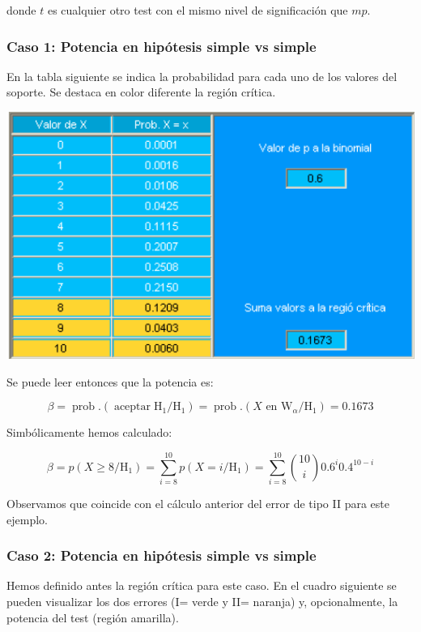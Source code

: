 \documentclass[
]{article}
\begin{document}
donde \(t\) es cualquier otro test con el mismo nivel de significación que \(mp\).

\subsubsection{Caso 1: Potencia en hipótesis simple vs simple}\label{caso-1-potencia-en-hipuxf3tesis-simple-vs-simple}

En la tabla siguiente se indica la probabilidad para cada uno de los valores del soporte. Se destaca en color diferente la región crítica.

\begin{center}\includegraphics[width=0.9\linewidth]{images/cap9-ProbsTestOptim} \end{center}

Se puede leer entonces que la potencia es:

\[
\beta=\operatorname{prob} .\left(\operatorname{aceptar} \mathrm{H}_{1} / \mathrm{H}_{1}\right)=\operatorname{prob} .\left(X \text { en } \mathrm{W}_{\alpha} / \mathrm{H}_{1}\right)=0.1673
\]

Simbólicamente hemos calculado:

\[
\beta=p\left(X \geq 8 / \mathrm{H}_{1}\right)=\sum_{i=8}^{10} p\left(X=i / \mathrm{H}_{1}\right)=\sum_{i=8}^{10}\binom{10}{i} 0.6^{i} 0.4^{10-i}
\]

Observamos que coincide con el cálculo anterior del error de tipo II para este ejemplo.

\subsubsection{Caso 2: Potencia en hipótesis simple vs simple}\label{caso-2-potencia-en-hipuxf3tesis-simple-vs-simple}

Hemos definido antes la región crítica para este caso. En el cuadro siguiente se pueden visualizar los dos errores (I= verde y II= naranja) y, opcionalmente, la potencia del test (región amarilla).
\end{document}
